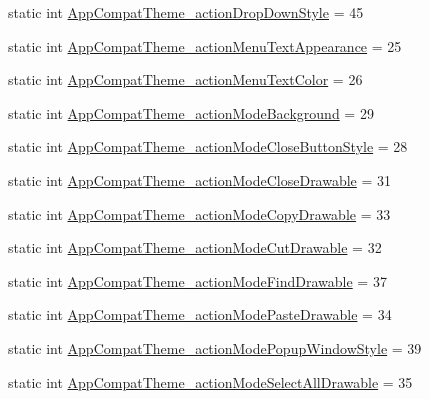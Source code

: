 \begin{DoxyCompactItemize}
\item 
static int \hyperlink{classandroid_1_1support_1_1design_1_1R_1_1styleable_a957bedc8ddafbc2bad20cfbde1be90c8}{App\+Compat\+Theme\+\_\+action\+Drop\+Down\+Style} = 45
\item 
static int \hyperlink{classandroid_1_1support_1_1design_1_1R_1_1styleable_a79a449d47565fce4e42e3450e3f6a326}{App\+Compat\+Theme\+\_\+action\+Menu\+Text\+Appearance} = 25
\item 
static int \hyperlink{classandroid_1_1support_1_1design_1_1R_1_1styleable_a156db0d0e55cd2febf73892e2d0e20ad}{App\+Compat\+Theme\+\_\+action\+Menu\+Text\+Color} = 26
\item 
static int \hyperlink{classandroid_1_1support_1_1design_1_1R_1_1styleable_a558b51abb51bf7789c77678e8251a2e1}{App\+Compat\+Theme\+\_\+action\+Mode\+Background} = 29
\item 
static int \hyperlink{classandroid_1_1support_1_1design_1_1R_1_1styleable_a140f9d445f81bdf8ba5f95c0542ca529}{App\+Compat\+Theme\+\_\+action\+Mode\+Close\+Button\+Style} = 28
\item 
static int \hyperlink{classandroid_1_1support_1_1design_1_1R_1_1styleable_aac470b6ebccb4d44a9441e2ca1de77dc}{App\+Compat\+Theme\+\_\+action\+Mode\+Close\+Drawable} = 31
\item 
static int \hyperlink{classandroid_1_1support_1_1design_1_1R_1_1styleable_afef45b44846fb895b555dc4c25849622}{App\+Compat\+Theme\+\_\+action\+Mode\+Copy\+Drawable} = 33
\item 
static int \hyperlink{classandroid_1_1support_1_1design_1_1R_1_1styleable_aa4f155cf001a007b34829305ec1b8bf4}{App\+Compat\+Theme\+\_\+action\+Mode\+Cut\+Drawable} = 32
\item 
static int \hyperlink{classandroid_1_1support_1_1design_1_1R_1_1styleable_a87e11e5ef34e5a6b9426ee90ef001590}{App\+Compat\+Theme\+\_\+action\+Mode\+Find\+Drawable} = 37
\item 
static int \hyperlink{classandroid_1_1support_1_1design_1_1R_1_1styleable_af873cad74307d6ae72d31314ebb7eb9d}{App\+Compat\+Theme\+\_\+action\+Mode\+Paste\+Drawable} = 34
\item 
static int \hyperlink{classandroid_1_1support_1_1design_1_1R_1_1styleable_af493b8a4fc8e112fffaddcdef4b737bb}{App\+Compat\+Theme\+\_\+action\+Mode\+Popup\+Window\+Style} = 39
\item 
static int \hyperlink{classandroid_1_1support_1_1design_1_1R_1_1styleable_aaf0de120209af4d10c6850f628fc12b1}{App\+Compat\+Theme\+\_\+action\+Mode\+Select\+All\+Drawable} = 35
\item 

\end{DoxyCompactItemize}
